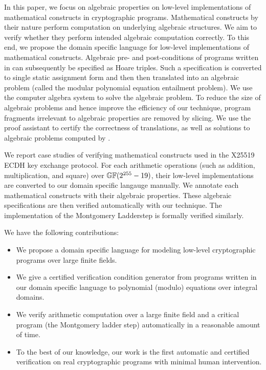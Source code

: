 In this paper, we focus on algebraic properties on low-level
implementations of mathematical constructs in cryptographic programs.
Mathematical constructs by their nature perform computation on
underlying algebraic structures. We aim to verify whether they perform
intended algebraic computation correctly. To this end, we propose the
domain specific language \mydsl for low-level implementations of
mathematical constructs. Algebraic pre- and post-conditions of
programs written in \mydsl can subsequently be specified as Hoare
triples. Such a specification is converted to single static assignment
form and then then translated into an algebraic problem (called the
modular polynomial equation entailment problem). We use the computer
algebra system \singular to solve the algebraic problem. To reduce the
size of algebraic problems and hence improve the efficiency of our
technique, program fragments irrelevant to algebraic properties are
removed by slicing. We use the proof assistant \coq to certify the
correctness of translations, as well as solutions to algebraic
problems computed by \singular.

We report case studies of verifying mathematical constructs used in
the X25519 ECDH key exchange protocol. For each arithmetic operations
(such as addition, multiplication, and square) over $\mathbb{GF}(2^{255} - 19)$,
their low-level \qhasm implementations are converted to our domain
specific langauge \mydsl manually. We annotate each mathematical
constructs with their algebraic properties. These algebraic
specifications are then verified automatically with our technique. 
The \qhasm implementation of the Montgomery Ladderstep is formally
verified similarly.  



We have the following contributions:
\begin{itemize}
\item We propose a domain specific language for modeling low-level
  cryptographic programs over large finite fields.
\item We give a certified verification condition generator from
  programs written in our domain specific language to polynomial
  (modulo) equations over integral domains.
\item We verify arithmetic computation over a large finite field and a
  critical program (the Montgomery ladder step) automatically in a
  reasonable amount of time.  
\item To the best of our knowledge, our work is the first automatic
  and certified verification on real cryptographic programs with
  minimal human intervention.
\end{itemize}
